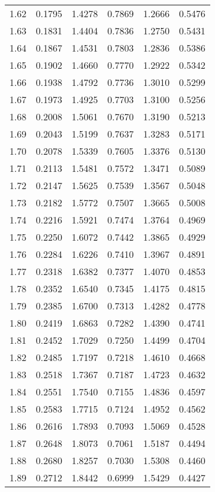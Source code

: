 \documentclass{article}
\begin{document}
\begin{longtable}{cccccc}
1.62 & 0.1795 & 1.4278 & 0.7869 & 1.2666 & 0.5476 \\
1.63 & 0.1831 & 1.4404 & 0.7836 & 1.2750 & 0.5431 \\
1.64 & 0.1867 & 1.4531 & 0.7803 & 1.2836 & 0.5386 \\
1.65 & 0.1902 & 1.4660 & 0.7770 & 1.2922 & 0.5342 \\
1.66 & 0.1938 & 1.4792 & 0.7736 & 1.3010 & 0.5299 \\
1.67 & 0.1973 & 1.4925 & 0.7703 & 1.3100 & 0.5256 \\
1.68 & 0.2008 & 1.5061 & 0.7670 & 1.3190 & 0.5213 \\
1.69 & 0.2043 & 1.5199 & 0.7637 & 1.3283 & 0.5171 \\
1.70 & 0.2078 & 1.5339 & 0.7605 & 1.3376 & 0.5130 \\
1.71 & 0.2113 & 1.5481 & 0.7572 & 1.3471 & 0.5089 \\
1.72 & 0.2147 & 1.5625 & 0.7539 & 1.3567 & 0.5048 \\
1.73 & 0.2182 & 1.5772 & 0.7507 & 1.3665 & 0.5008 \\
1.74 & 0.2216 & 1.5921 & 0.7474 & 1.3764 & 0.4969 \\
1.75 & 0.2250 & 1.6072 & 0.7442 & 1.3865 & 0.4929 \\
1.76 & 0.2284 & 1.6226 & 0.7410 & 1.3967 & 0.4891 \\
1.77 & 0.2318 & 1.6382 & 0.7377 & 1.4070 & 0.4853 \\
1.78 & 0.2352 & 1.6540 & 0.7345 & 1.4175 & 0.4815 \\
1.79 & 0.2385 & 1.6700 & 0.7313 & 1.4282 & 0.4778 \\
1.80 & 0.2419 & 1.6863 & 0.7282 & 1.4390 & 0.4741 \\
1.81 & 0.2452 & 1.7029 & 0.7250 & 1.4499 & 0.4704 \\
1.82 & 0.2485 & 1.7197 & 0.7218 & 1.4610 & 0.4668 \\
1.83 & 0.2518 & 1.7367 & 0.7187 & 1.4723 & 0.4632 \\
1.84 & 0.2551 & 1.7540 & 0.7155 & 1.4836 & 0.4597 \\
1.85 & 0.2583 & 1.7715 & 0.7124 & 1.4952 & 0.4562 \\
1.86 & 0.2616 & 1.7893 & 0.7093 & 1.5069 & 0.4528 \\
1.87 & 0.2648 & 1.8073 & 0.7061 & 1.5187 & 0.4494 \\
1.88 & 0.2680 & 1.8257 & 0.7030 & 1.5308 & 0.4460 \\
1.89 & 0.2712 & 1.8442 & 0.6999 & 1.5429 & 0.4427 \\

\end{longtable}
\end{document}
